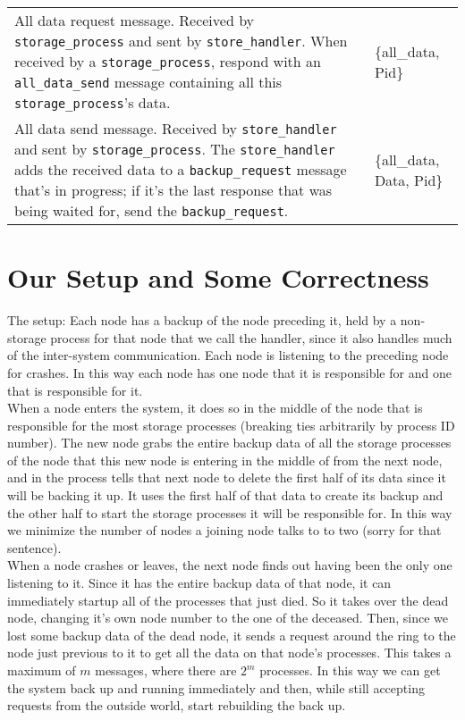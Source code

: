 \documentclass[12pt,letterpaper]{article}
\renewcommand{\tt}[1]{\texttt{#1}}
\newcommand{\sh}{\tt{store\_handler}}
\renewcommand{\sp}{\tt{storage\_process}}
\begin{document}
\begin{longtable}{p{4.5in}T}
All data request message.  Received by \sp{} and sent by \sh.  When received by a \sp, respond with an \tt{all\_data\_send} message containing all this \sp's data.  & \{all\_data, Pid\} \\

All data send message.  Received by \sh{} and sent by \sp.  The \sh{} adds the received data to a \tt{backup\_request} message that's in progress; if it's the last response that was being waited for, send the \tt{backup\_request}. & \{all\_data, Data, Pid\}

\end{longtable}

\clearpage
\onehalfspacing

\section*{Our Setup and Some Correctness}
The setup:
Each node has a backup of the node preceding it, held by a non-storage process for that node that we call the handler, since it also handles much of the inter-system communication. Each node is listening to the preceding node for crashes. In this way each node has one node that it is responsible for and one that is responsible for it. \\
When a node enters the system, it does so in the middle of the node that is responsible for the most storage processes (breaking ties arbitrarily by process ID number). The new node grabs the entire backup data of all the storage processes of the node that this new node is entering in the middle of from the next node, and in the process tells that next node to delete the first half of its data since it will be backing it up. It uses the first half of that data to create its backup and the other half to start the storage processes it will be responsible for. In this way we minimize the number of nodes a joining node talks to to two (sorry for that sentence). \\
When a node crashes or leaves, the next node finds out having been the only one listening to it. Since it has the entire backup data of that node, it can immediately startup all of the processes that just died. So it takes over the dead node, changing it's own node number to the one of the deceased. Then, since we lost some backup data of the dead node, it sends a request around the ring to the node just previous to it to get all the data on that node's processes. This takes a maximum of $m$ messages, where there are $2^m$ processes. In this way we can get the system back up and running immediately and then, while still accepting requests from the outside world, start rebuilding the back up. \\
\end{document}
